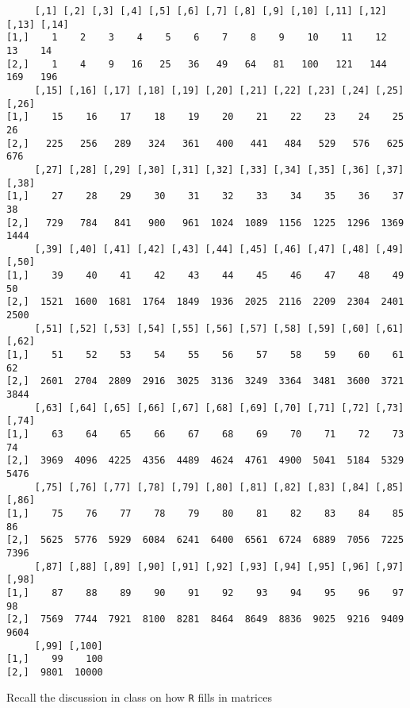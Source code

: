 \documentclass[
  letterpaper,
  DIV=11,
  numbers=noendperiod]{scrartcl}
\begin{document}
\begin{enumerate}
\begin{verbatim}
     [,1] [,2] [,3] [,4] [,5] [,6] [,7] [,8] [,9] [,10] [,11] [,12] [,13] [,14]
[1,]    1    2    3    4    5    6    7    8    9    10    11    12    13    14
[2,]    1    4    9   16   25   36   49   64   81   100   121   144   169   196
     [,15] [,16] [,17] [,18] [,19] [,20] [,21] [,22] [,23] [,24] [,25] [,26]
[1,]    15    16    17    18    19    20    21    22    23    24    25    26
[2,]   225   256   289   324   361   400   441   484   529   576   625   676
     [,27] [,28] [,29] [,30] [,31] [,32] [,33] [,34] [,35] [,36] [,37] [,38]
[1,]    27    28    29    30    31    32    33    34    35    36    37    38
[2,]   729   784   841   900   961  1024  1089  1156  1225  1296  1369  1444
     [,39] [,40] [,41] [,42] [,43] [,44] [,45] [,46] [,47] [,48] [,49] [,50]
[1,]    39    40    41    42    43    44    45    46    47    48    49    50
[2,]  1521  1600  1681  1764  1849  1936  2025  2116  2209  2304  2401  2500
     [,51] [,52] [,53] [,54] [,55] [,56] [,57] [,58] [,59] [,60] [,61] [,62]
[1,]    51    52    53    54    55    56    57    58    59    60    61    62
[2,]  2601  2704  2809  2916  3025  3136  3249  3364  3481  3600  3721  3844
     [,63] [,64] [,65] [,66] [,67] [,68] [,69] [,70] [,71] [,72] [,73] [,74]
[1,]    63    64    65    66    67    68    69    70    71    72    73    74
[2,]  3969  4096  4225  4356  4489  4624  4761  4900  5041  5184  5329  5476
     [,75] [,76] [,77] [,78] [,79] [,80] [,81] [,82] [,83] [,84] [,85] [,86]
[1,]    75    76    77    78    79    80    81    82    83    84    85    86
[2,]  5625  5776  5929  6084  6241  6400  6561  6724  6889  7056  7225  7396
     [,87] [,88] [,89] [,90] [,91] [,92] [,93] [,94] [,95] [,96] [,97] [,98]
[1,]    87    88    89    90    91    92    93    94    95    96    97    98
[2,]  7569  7744  7921  8100  8281  8464  8649  8836  9025  9216  9409  9604
     [,99] [,100]
[1,]    99    100
[2,]  9801  10000
\end{verbatim}
\end{enumerate}

\begin{tcolorbox}[enhanced jigsaw, colback=white, bottomrule=.15mm, coltitle=black, rightrule=.15mm, toprule=.15mm, opacityback=0, title=\textcolor{quarto-callout-warning-color}{\faExclamationTriangle}\hspace{0.5em}{Tip}, breakable, colbacktitle=quarto-callout-warning-color!10!white, opacitybacktitle=0.6, bottomtitle=1mm, colframe=quarto-callout-warning-color-frame, toptitle=1mm, leftrule=.75mm, arc=.35mm, titlerule=0mm, left=2mm]

Recall the discussion in class on how \texttt{R} fills in matrices

\end{tcolorbox}
\end{document}
